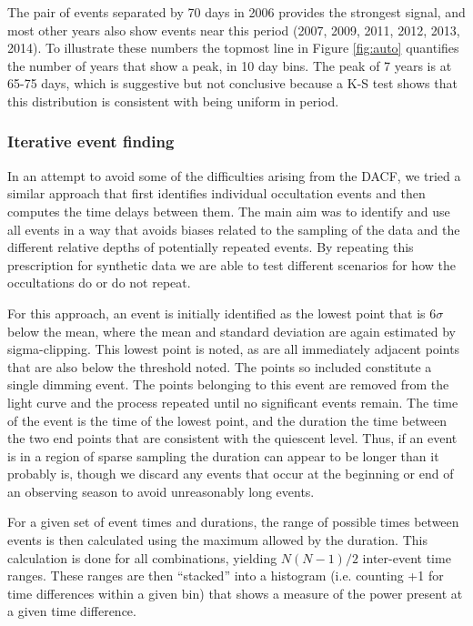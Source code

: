 \documentclass[]{rsos}
\begin{document}
The pair of events separated by 70 days in 2006 provides the strongest signal, and most
other years also show events near this period (2007, 2009, 2011, 2012, 2013, 2014). To
illustrate these numbers the topmost line in Figure \ref{fig:auto} quantifies the number
of years that show a peak, in 10 day bins. The peak of 7 years is at 65-75 days, which is
suggestive but not conclusive because a K-S test shows that this distribution is
consistent with being uniform in period.

\subsubsection{Iterative event finding}\label{sss:iter}

In an attempt to avoid some of the difficulties arising from the DACF, we tried a similar
approach that first identifies individual occultation events and then computes the time
delays between them. The main aim was to identify and use all events in a way that avoids
biases related to the sampling of the data and the different relative depths of
potentially repeated events. By repeating this prescription for synthetic data we are
able to test different scenarios for how the occultations do or do not repeat.

For this approach, an event is initially identified as the lowest point that is 6$\sigma$
below the mean, where the mean and standard deviation are again estimated by
sigma-clipping. This lowest point is noted, as are all immediately adjacent points that
are also below the threshold noted. The points so included constitute a single dimming
event. The points belonging to this event are removed from the light curve and the
process repeated until no significant events remain. The time of the event is the time of
the lowest point, and the duration the time between the two end points that are
consistent with the quiescent level. Thus, if an event is in a region of sparse sampling
the duration can appear to be longer than it probably is, though we discard any events
that occur at the beginning or end of an observing season to avoid unreasonably long
events.

For a given set of event times and durations, the range of possible times between events
is then calculated using the maximum allowed by the duration. This calculation is done
for all combinations, yielding $N(N-1)/2$ inter-event time ranges. These ranges are then
``stacked'' into a histogram (i.e. counting +1 for time differences within a given bin)
that shows a measure of the power present at a given time difference.
\end{document}
